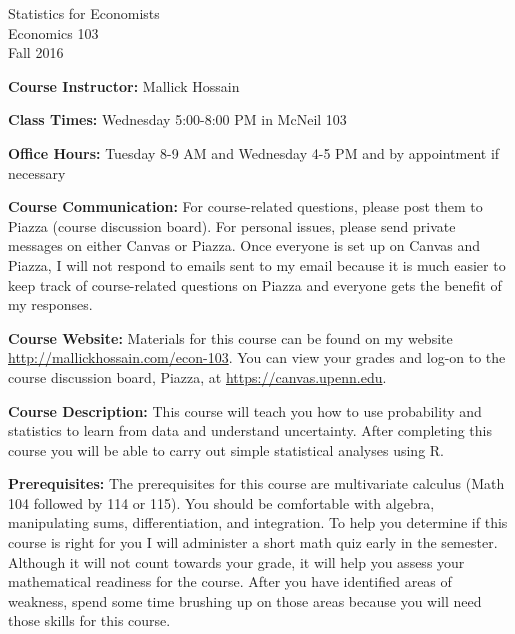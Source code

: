 \documentclass[11pt, letterpaper]{article}
\begin{document}
\thispagestyle{plain}

\begin{center}
\Large
\sc
Statistics for Economists\\
\large
Economics 103\\
\large
Fall 2016
\end{center}


\normalsize
\bigskip
\noindent \textbf{Course Instructor:} Mallick Hossain

\medskip

\noindent \textbf{Class Times:} Wednesday 5:00-8:00 PM in McNeil 103

\medskip

\noindent \textbf{Office Hours:} Tuesday 8-9 AM and Wednesday 4-5 PM and by appointment if necessary

\medskip

\noindent \textbf{Course Communication:} 
For course-related questions, please post them to Piazza (course discussion board). 
For personal issues, please send private messages on either Canvas or Piazza. 
Once everyone is set up on Canvas and Piazza, I will not respond to emails sent to my email because it is much easier to keep track of course-related questions on Piazza and everyone gets the benefit of my responses. 

\medskip
 
\noindent \textbf{Course Website:} Materials for this course can be found on my website \url{http://mallickhossain.com/econ-103}. 
You can view your grades and log-on to the course discussion board, Piazza, at \url{https://canvas.upenn.edu}.

\medskip

\noindent \textbf{Course Description:} 
This course will teach you how to use probability and statistics to learn from data and understand uncertainty. 
After completing this course you will be able to carry out simple statistical analyses using R.

\medskip

\noindent \textbf{Prerequisites:} 
The prerequisites for this course are multivariate calculus (Math 104 followed by 114 or 115). 
You should be comfortable with algebra, manipulating sums, differentiation, and integration. 
To help you determine if this course is right for you I will administer a short math quiz early in the semester. 
Although it will not count towards your grade, it will help you assess your mathematical readiness for the course. 
After you have identified areas of weakness, spend some time brushing up on those areas because you will need those skills for this course.
\end{document}

